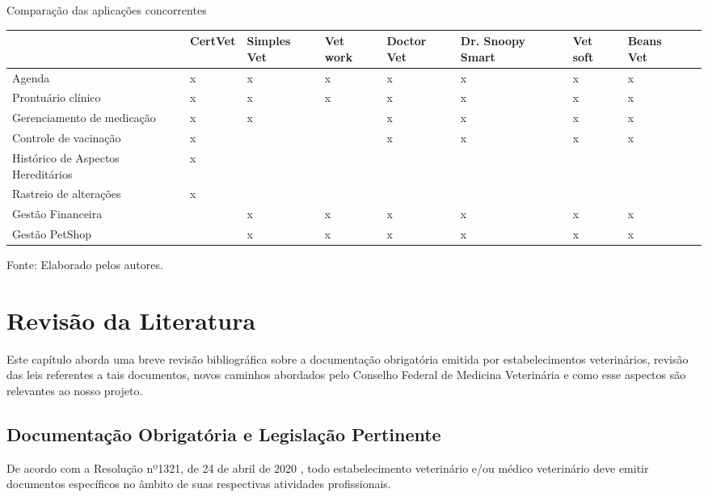 \documentclass[
    12pt,               %
    openright,          %
    oneside,
    a4paper,            %
    BIBLATEX,           %
    TODO,               %
    english,            %
    brazil              %
    ]{ifsp-spo-inf-ctds}
\begin{document}
    \begin{center}
    \begin{quadro}[H]
     \caption{Comparação das aplicações concorrentes}
    \label{tab:comparativa}
    \begin{tabulary}{1.0\textwidth}{|L|L|L|L|L|L|L|L|L|}
    \hline
     & CertVet & Simples Vet & Vet work & Doctor Vet & Dr. Snoopy Smart & Vet soft & Beans Vet\\
    \hline
    Agenda & x & x & x & x & x & x & x\\
    \hline
    Prontuário clínico & x & x & x & x & x & x & x\\
    \hline
    Gerenciamento de medicação & x & x &  & x & x & x & x\\
    \hline
    Controle de vacina\c{c}ão & x &  &  & x & x & x & x\\
    \hline
    Histórico de Aspectos Hereditários & x &  &  &  &  &  & \\
    \hline
    Rastreio de alterações & x &  &  &  &  &  & \\
    \hline
    Gestão Financeira &  & x & x & x & x & x & x\\
    \hline
    Gestão PetShop &  & x & x & x & x & x & x\\
    \hline
    \end{tabulary}
    \centering
    {\footnotesize Fonte: Elaborado pelos autores.}
    \end{quadro}
\end{center}

\chapter[Revisão de Literatura]{Revisão da Literatura} \label{revisao_lit}

    Este capítulo aborda uma breve revisão bibliográfica sobre a documentação obrigatória emitida por estabelecimentos veterinários, revisão das leis referentes a tais documentos, novos caminhos abordados pelo Conselho Federal de Medicina Veterinária e como esse aspectos são relevantes ao nosso projeto.


    \section{Documentação Obrigatória e Legislação Pertinente}

        De acordo com a Resolução nº1321, de 24 de abril de 2020 , todo estabelecimento veterinário e/ou médico veterinário deve emitir documentos específicos no âmbito de suas respectivas atividades profissionais.
\end{document}
